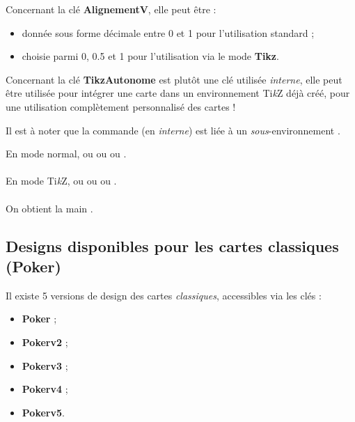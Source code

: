 \documentclass{article}
\providecommand\tikzlogo{Ti\textit{k}Z}
\let\TikZ\tikzlogo
\newcommand\ctex[1]{\tcbox[vignettelatex]{#1}}
\newcommand\Cle[1]{{\bfseries\sffamily\textlangle #1\textrangle}}
\begin{document}
{{{{{{{{{\begin{codeinfo}
Concernant la clé \Cle{AlignementV}, elle peut être  :

\begin{itemize}
	\item donnée sous forme décimale entre 0 et 1 pour l'utilisation standard ;
	\item choisie parmi 0, 0.5 et 1 pour l'utilisation via le mode \Cle{Tikz}.
\end{itemize}
\end{codeinfo}

\begin{codeinfo}
Concernant la clé \Cle{TikzAutonome} est plutôt une clé utilisée \textit{interne}, elle peut être utilisée pour intégrer une carte dans un environnement \TikZ{} déjà créé, pour une utilisation complètement personnalisé des cartes !

\smallskip

Il est à noter que la commande (en \textit{interne}) est liée à un \textit{sous}-environnement \ctex{scope}.
\end{codeinfo}

\begin{codetex}[]
En mode normal,  ou  ou
 ou .\\ \\
En mode \TikZ, 
ou 
ou 
ou .\\ \\
On obtient la main .
\end{codetex}

\pagebreak

\subsection{Designs disponibles pour les cartes classiques (Poker)}

\begin{codeinfo}
Il existe 5 versions de design des cartes \textit{classiques}, accessibles via les clés :

\begin{itemize}
	\item \Cle{Poker} ;
	\item \Cle{Pokerv2} ;
	\item \Cle{Pokerv3} ;
	\item \Cle{Pokerv4} ;
	\item \Cle{Pokerv5}.
\end{itemize}
\end{codeinfo}

}}}}}}}}}
\end{document}
